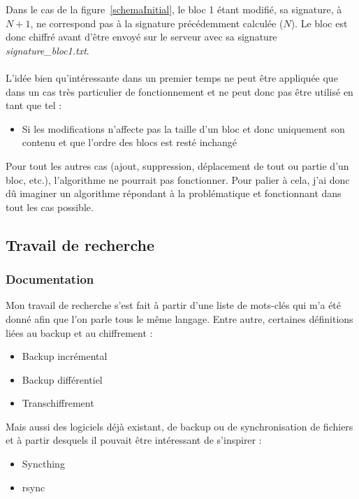 \documentclass[a4paper,10pt, twoside]{report}
\begin{document}
\begin{spacing}{1.2}
Dans le cas de la figure~\ref{schemaInitial}, le bloc 1 \'etant modifi\'e, sa
signature, \`a \(N + 1\), ne correspond pas \`a la signature pr\'ec\'edemment
calcul\'ee (\(N\)). Le bloc est donc chiffr\'e avant d'\^etre envoy\'e sur le
serveur avec sa signature \textit{signature\_bloc1.txt}.

\paragraph{}
L'id\'ee bien qu'int\'eressante dans un premier temps ne peut \^etre
appliqu\'ee que dans un cas tr\`es particulier de fonctionnement et ne peut
donc pas \^etre utilis\'e en tant que tel :
\begin{itemize}
 \item Si les modifications n'affecte pas la taille d'un bloc et donc
 uniquement son contenu et que l'ordre des blocs est rest\'e inchang\'e
\end{itemize}

Pour tout les autres cas (ajout, suppression, d\'eplacement de tout ou partie
d'un bloc, etc.), l'algorithme ne pourrait pas fonctionner. Pour palier \`a
cela, j'ai donc d\^u imaginer un algorithme r\'epondant \`a la probl\'ematique
et fonctionnant dans tout les cas possible.

\subsection{Travail de recherche}
\subsubsection{Documentation}
Mon travail de recherche s'est fait \`a partir d'une liste de mots-cl\'es qui
m'a \'et\'e donn\'e afin que l'on parle tous le m\^eme langage. Entre autre,
certaines d\'efinitions li\'ees au backup et au chiffrement :
\begin{itemize}
 \item Backup incr\'emental
 \item Backup diff\'erentiel
 \item Transchiffrement
\end{itemize}

Mais aussi des logiciels d\'ej\`a existant, de backup ou de synchronisation de
fichiers et \`a partir desquels il pouvait \^etre int\'eressant de s'inspirer :
\begin{itemize}
 \item Syncthing~\cite{refSyncthing}
 \item rsync~\cite{refRsync}
\end{itemize}


\end{spacing}
\end{document}
